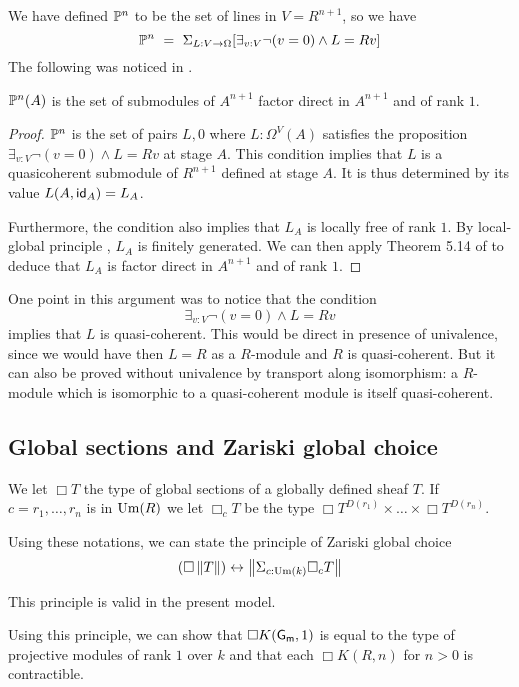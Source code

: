 We have defined $\mathbb{P}^n$ to be the set of lines in $V = R^{n+1}$, so we have
$$
\mathbb{P}^n ~=~ \Sigma_{L:V\rightarrow \Omega}[\exists_{v:V}\neg (v = 0)\wedge L = R v]
$$
The following was noticed in \cite{kockreyes}.

\begin{proposition}
  $\mathbb{P}^n(A)$ is the set of submodules of $A^{n+1}$ factor direct in $A^{n+1}$ and of rank $1$.
\end{proposition}

\begin{proof}
  $\mathbb{P}^n$ is the set of pairs $L,0$ where $L:\Omega^V(A)$ satisfies the proposition $\exists_{v:V}\neg (v = 0)\wedge L = Rv$ at stage
  $A$. This condition implies that $L$ is a quasicoherent submodule of $R^{n+1}$ defined at stage $A$.
  It is thus determined by its value $L(A,\mathsf{id}_A) = L_A$.

  Furthermore, the condition also implies that $L_A$ is locally free of rank $1$. By local-global principle \cite{lombardi-quitte},
  $L_A$ is finitely generated. We can then apply Theorem 5.14 of
  \cite{lombardi-quitte} to deduce that $L_A$ is factor direct in $A^{n+1}$ and of rank $1$.
\end{proof}

One point in this argument was to notice that the condition
$$
\exists_{v:V}\neg (v = 0)\wedge L = R v
$$
implies that $L$ is quasi-coherent. This would be direct in presence of univalence, since we would have then $L = R$ as a $R$-module
and $R$ is quasi-coherent. But it can also be proved without univalence by transport along isomorphism: a $R$-module which is
isomorphic to a quasi-coherent module is itself quasi-coherent.


\subsection{Global sections and Zariski global choice}

We let $\Box T$ the type of global sections of a globally defined sheaf $T$.
If $c = r_1,\dots,r_n$ is in $\mathrm{Um}(R)$ we let $\Box_c T$ be the type $\Box T^{D(r_1)}\times\dots\times\Box T^{D(r_n)}$.

Using these notations, we can state the principle of Zariski global choice
$$
(\Box \left\lVert T \right\rVert)\leftrightarrow \left\lVert \Sigma_{c:\mathrm{Um}(k)}\Box_c T \right\rVert
$$

This principle is valid in the present model.

Using this principle, we can show that $\Box K(\mathsf{G_m},1)$ is equal to the type of projective modules of rank $1$ over $k$
and that each $\Box K(R,n)$ for $n>0$ is contractible.
                                                                                  

 

